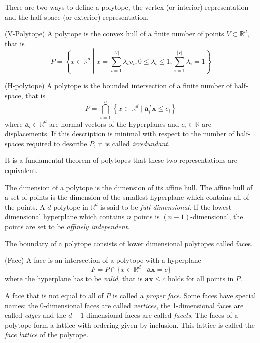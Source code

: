 There are 
two ways to define a polytope, the vertex (or interior) representation and the 
half-space (or exterior) representation.

\begin{definition}
(V-Polytope) A polytope is the convex hull of a finite number of points $V 
\subset \mathbb{R}^d$, that is 
\begin{equation}
 P = \left\{x\in \mathbb{R}^d \middle| x = \sum_{i=1}^{|V|} \lambda_i v_i, 
0\leq \lambda_i \leq 1, \sum_{i=1}^{|V|} \lambda_i = 1 \right\}
\end{equation}

\end{definition}

\begin{definition}
 (H-polytope) A polytope is the bounded intersection of a finite number of 
half-space, that is
\begin{equation}
 P = \bigcap_{i=1}^n \left\{x \in \mathbb{R}^d \mid \mathbf{a}_i^T \mathbf{x} 
\leq 
c_i \right\}
\end{equation}
where $\mathbf{a}_i \in \mathbb{R}^d$ are normal vectors of the hyperplanes and 
$c_i \in 
\mathbb{R}$ are displacements. If this description is minimal with respect to 
the number of half-spaces required to describe $P$, it is called 
\textit{irredundant}.
\end{definition}

It is a fundamental theorem of polytopes that these two representations are 
equivalent.

The dimension of a polytope is the dimension of its affine hull. The affine 
hull of a set of points is the dimension of the smallest hyperplane which 
contains all of the points. A $d$-polytope in $\mathbb{R}^d$ is said to be 
\textit{full-dimensional}. If the lowest dimensional hyperplane which contains 
$n$ points is $(n-1)$-dimensional, the points are set to be \textit{affinely 
independent}.

 The boundary 
of a polytope consists of lower dimensional polytopes called faces. 
\begin{definition}
 (Face) A face is an intersection of a polytope with a hyperplane 
\begin{equation}
 F = P \cap \{x \in \mathbb{R}^d \mid \mathbf{a}\mathbf{x} = c\}
\end{equation}
where the hyperplane has to be \textit{valid}, that is $\mathbf{a}\mathbf{x} 
\leq c$ holds for all points in $P$. 

\end{definition}
A face that is not equal to all of $P$ is called a \textit{proper face}.
Some faces have special names: the 0-dimensional faces are called 
\textit{vertices}, the 1-dimensional faces are called \textit{edges} and the 
$d-1$-dimensional faces are called \textit{facets}.
 The faces of a polytope 
form a lattice with ordering given by inclusion. This lattice is called the 
\textit{face lattice} of the polytope.

